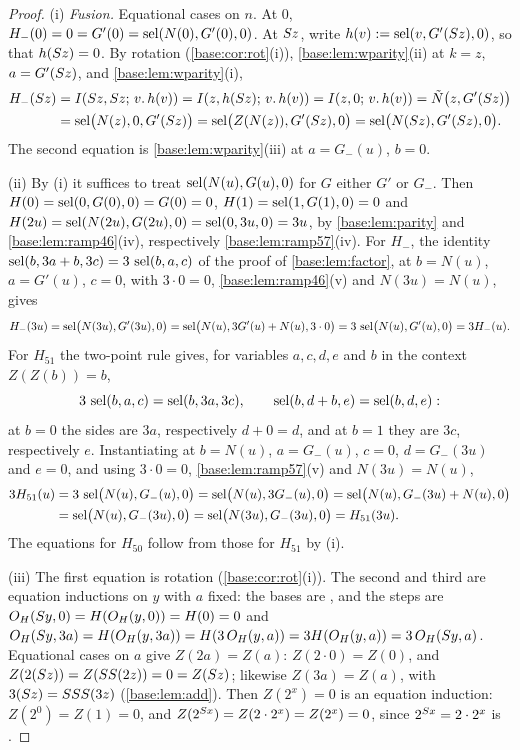 \begin{proof}
(i) \emph{Fusion.}  Equational cases on $n$.  At $0$,
$H_-(0)=0=G'(0)=\operatorname{sel}(N(0),G'(0),0)$.  At $S z$, write
$h(v)\mathrel{:=}\operatorname{sel}(v,G'(S z),0)$, so that $h(S z)=0$.  By rotation
(\cref{base:cor:rot}(i)), \cref{base:lem:wparity}(ii) at $k=z$,
$a=G'(S z)$, and \cref{base:lem:wparity}(i),
\begin{align*}
 H_-(S z)&=I(S z,S z;\,v.\,h(v))=I(z,h(S z);\,v.\,h(v))
  =I(z,0;\,v.\,h(v))=\tilde N\bigl(z,G'(S z)\bigr)\\
 &=\operatorname{sel}\bigl(N(z),0,G'(S z)\bigr)=\operatorname{sel}\bigl(Z(N(z)),G'(S z),0\bigr)
  =\operatorname{sel}\bigl(N(S z),G'(S z),0\bigr).
\end{align*}
The second equation is \cref{base:lem:wparity}(iii) at $a=G_-(u)$, $b=0$.

(ii) By (i) it suffices to treat $\operatorname{sel}(N(u),G(u),0)$ for $G$ either $G'$ or
$G_-$.  Then $H(0)=\operatorname{sel}(0,G(0),0)=G(0)=0$,
$H(1)=\operatorname{sel}(1,G(1),0)=0$ and $H(2u)=\operatorname{sel}(N(2u),G(2u),0)=\operatorname{sel}(0,3u,0)=3u$, by
\cref{base:lem:parity} and \cref{base:lem:ramp46}(iv), respectively
\cref{base:lem:ramp57}(iv).  For $H_-$, the identity
$\operatorname{sel}(b,3a+b,3c)=3\,\operatorname{sel}(b,a,c)$ of the proof of \cref{base:lem:factor}, at
$b=N(u)$, $a=G'(u)$, $c=0$, with $3\cdot 0=0$, \cref{base:lem:ramp46}(v) and
$N(3u)=N(u)$, gives
\[
 H_-(3u)=\operatorname{sel}\bigl(N(3u),G'(3u),0\bigr)=\operatorname{sel}\bigl(N(u),3G'(u)+N(u),3\cdot 0\bigr)
 =3\,\operatorname{sel}\bigl(N(u),G'(u),0\bigr)=3H_-(u).
\]
For $H_{51}$ the two-point rule gives, for variables $a,c,d,e$ and $b$ in the
context $Z(Z(b))=b$,
\[
 3\,\operatorname{sel}(b,a,c)=\operatorname{sel}(b,3a,3c),\qquad \operatorname{sel}(b,d+b,e)=\operatorname{sel}(b,d,e):
\]
at $b=0$ the sides are $3a$, respectively $d+0=d$, and at $b=1$ they are
$3c$, respectively $e$.  Instantiating at $b=N(u)$, $a=G_-(u)$, $c=0$,
$d=G_-(3u)$ and $e=0$, and using $3\cdot 0=0$, \cref{base:lem:ramp57}(v)
and $N(3u)=N(u)$,
\begin{align*}
 3H_{51}(u)&=3\,\operatorname{sel}\bigl(N(u),G_-(u),0\bigr)=\operatorname{sel}\bigl(N(u),3G_-(u),0\bigr)
  =\operatorname{sel}\bigl(N(u),G_-(3u)+N(u),0\bigr)\\
 &=\operatorname{sel}\bigl(N(u),G_-(3u),0\bigr)=\operatorname{sel}\bigl(N(3u),G_-(3u),0\bigr)=H_{51}(3u).
\end{align*}
The equations for $H_{50}$ follow from those for $H_{51}$ by (i).

(iii) The first equation is rotation (\cref{base:cor:rot}(i)).  The second
and third are equation inductions on $y$ with $a$ fixed: the bases are
, and the steps are $O_H(S y,0)=H(O_H(y,0))=H(0)=0$ and
$O_H(S y,3a)=H(O_H(y,3a))=H(3\,O_H(y,a))=3H(O_H(y,a))=3\,O_H(S y,a)$.
Equational cases on $a$ give $Z(2a)=Z(a)$: $Z(2\cdot 0)=Z(0)$, and
$Z(2(S z))=Z(SS(2z))=0=Z(S z)$; likewise $Z(3a)=Z(a)$, with
$3(S z)=SSS(3z)$ (\cref{base:lem:add}).  Then $Z(2^{x})=0$ is an
equation induction: $Z(2^{0})=Z(1)=0$, and $Z(2^{S x})=Z(2\cdot 2^{x})
=Z(2^{x})=0$, since $2^{S x}=2\cdot 2^{x}$ is .


\end{proof}
